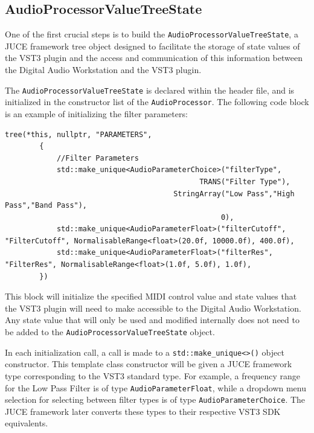 \documentclass[a4paper,12pt]{report}
\begin{document}
\subsection{AudioProcessorValueTreeState}
\label{subsec:apvt}
One of the first crucial steps is to build the \texttt{Audio\-Processor\-Value\-Tree\-State}, a JUCE framework tree object designed to facilitate the storage of state values of the VST3 plugin and the access and communication of this information between the Digital Audio Workstation and the VST3 plugin.

The \texttt{Audio\-Processor\-Value\-Tree\-State} is declared within the header file, and is initialized in the constructor list of the \texttt{Audio\-Processor}. The following code block is an example of initializing the filter parameters:


 \noindent\begin{minipage}{\linewidth} \begin{lstlisting}[caption={Initializing Filter Parameters},label={code:initfilterparam},captionpos=b]
tree(*this, nullptr, "PARAMETERS",
        {   
            //Filter Parameters
            std::make_unique<AudioParameterChoice>("filterType",
                                             TRANS("Filter Type"),
                                       StringArray("Low Pass","High Pass","Band Pass"),
                                                  0),
            std::make_unique<AudioParameterFloat>("filterCutoff", "FilterCutoff", NormalisableRange<float>(20.0f, 10000.0f), 400.0f),
            std::make_unique<AudioParameterFloat>("filterRes", "FilterRes", NormalisableRange<float>(1.0f, 5.0f), 1.0f),
        })
\end{lstlisting} \end{minipage}

This block will initialize the specified MIDI control value and state values that the VST3 plugin will need to make accessible to the Digital Audio Workstation. Any state value that will only be used and modified internally does not need to be added to the \texttt{Audio\-Processor\-Value\-Tree\-State} object.

In each initialization call, a call is made to a \texttt{std::make\_unique<>()} object constructor. This template class constructor will be given a JUCE framework type corresponding to the VST3 standard type. For example, a frequency range for the Low Pass Filter is of type \texttt{Audio\-Parameter\-Float}, while a dropdown menu selection for selecting between filter types is of type \texttt{Audio\-Parameter\-Choice}. The JUCE framework later converts these types to their respective VST3 SDK equivalents.
\end{document}
